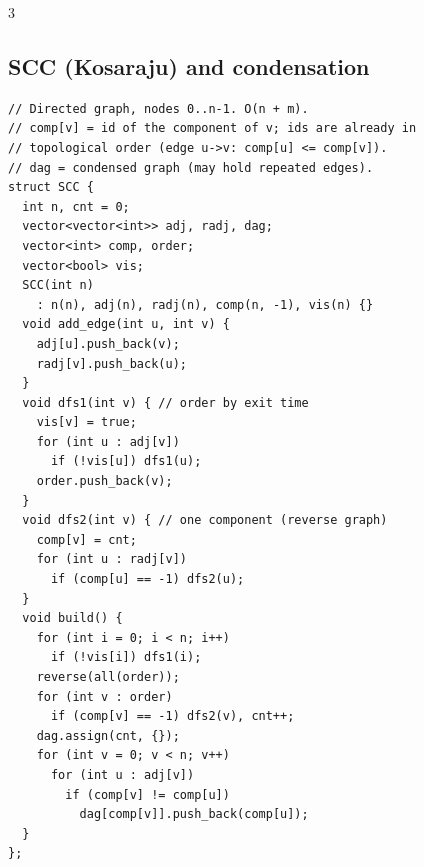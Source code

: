 \documentclass[8pt, a4paper]{article}
\begin{document}
\begin{multicols*}{3}
\subsection{SCC (Kosaraju) and condensation}
\begin{lstlisting}
// Directed graph, nodes 0..n-1. O(n + m).
// comp[v] = id of the component of v; ids are already in
// topological order (edge u->v: comp[u] <= comp[v]).
// dag = condensed graph (may hold repeated edges).
struct SCC {
  int n, cnt = 0;
  vector<vector<int>> adj, radj, dag;
  vector<int> comp, order;
  vector<bool> vis;
  SCC(int n)
    : n(n), adj(n), radj(n), comp(n, -1), vis(n) {}
  void add_edge(int u, int v) {
    adj[u].push_back(v);
    radj[v].push_back(u);
  }
  void dfs1(int v) { // order by exit time
    vis[v] = true;
    for (int u : adj[v])
      if (!vis[u]) dfs1(u);
    order.push_back(v);
  }
  void dfs2(int v) { // one component (reverse graph)
    comp[v] = cnt;
    for (int u : radj[v])
      if (comp[u] == -1) dfs2(u);
  }
  void build() {
    for (int i = 0; i < n; i++)
      if (!vis[i]) dfs1(i);
    reverse(all(order));
    for (int v : order)
      if (comp[v] == -1) dfs2(v), cnt++;
    dag.assign(cnt, {});
    for (int v = 0; v < n; v++)
      for (int u : adj[v])
        if (comp[v] != comp[u])
          dag[comp[v]].push_back(comp[u]);
  }
};
\end{lstlisting}

\end{multicols*}
\end{document}
